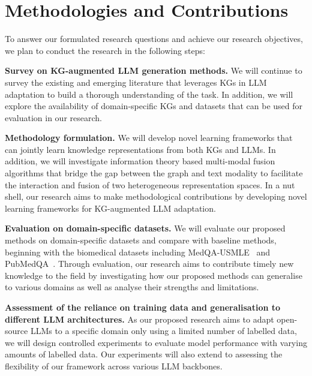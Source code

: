 \section*{Methodologies and Contributions}

To answer our formulated research questions and achieve our research objectives, we plan to conduct the research in the following steps:

\textbf{Survey on KG-augmented LLM generation methods. } 
We will continue to survey the existing and emerging literature that leverages KGs in LLM adaptation to build a thorough understanding of the task. 
In addition, we will explore the availability of domain-specific KGs and datasets that can be used for evaluation in our research.

\textbf{Methodology formulation.}
We will develop novel learning frameworks that can jointly learn knowledge representations from both KGs and LLMs.
In addition, we will investigate information theory based multi-modal fusion algorithms that bridge the gap between the graph and text modality to facilitate the interaction and fusion of two heterogeneous representation spaces. 
In a nut shell, our research aims to make methodological contributions by developing novel learning frameworks for KG-augmented LLM adaptation. 

\textbf{Evaluation on domain-specific datasets. } 
We will evaluate our proposed methods on domain-specific datasets and compare with baseline methods, beginning with the biomedical datasets including MedQA-USMLE~\parencite{medqa} and PubMedQA~\parencite{pubmedqa}.
Through evaluation, our research aims to contribute timely new knowledge to the field by investigating how our proposed methods can generalise to various domains as well as analyse their strengths and limitations. 

\textbf{Assessment of the reliance on training data and generalisation to different LLM architectures. }
As our proposed research aims to adapt open-source LLMs to a specific domain only using a limited number of labelled data, we will design controlled experiments to evaluate model performance with varying amounts of labelled data. Our experiments will also extend to assessing the flexibility of our framework across various LLM backbones.


